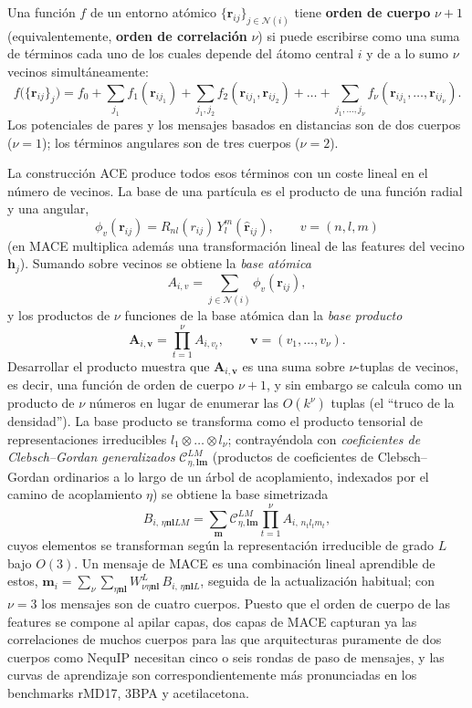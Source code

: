 \begin{definition}\label{def:orden_cuerpo}
Una función $f$ de un entorno atómico $\{\mathbf{r}_{ij}\}_{j \in \mathcal{N}(i)}$ tiene \textbf{orden de cuerpo} $\nu + 1$ (equivalentemente, \textbf{orden de correlación} $\nu$) si puede escribirse como una suma de términos cada uno de los cuales depende del átomo central $i$ y de a lo sumo $\nu$ vecinos simultáneamente:
\[f\big(\{\mathbf{r}_{ij}\}_j\big) = f_0 + \sum_{j_1} f_1(\mathbf{r}_{ij_1}) + \sum_{j_1, j_2} f_2(\mathbf{r}_{ij_1}, \mathbf{r}_{ij_2}) + \dots + \sum_{j_1, \dots, j_\nu} f_\nu(\mathbf{r}_{ij_1}, \dots, \mathbf{r}_{ij_\nu}).\]
Los potenciales de pares y los mensajes basados en distancias son de dos cuerpos ($\nu = 1$); los términos angulares son de tres cuerpos ($\nu = 2$).
\end{definition}

La construcción ACE produce todos esos términos con un coste lineal en el número de vecinos. La base de una partícula es el producto de una función radial y una angular,
\[\phi_v(\mathbf{r}_{ij}) = R_{nl}(r_{ij})\, Y_l^m(\hat{\mathbf{r}}_{ij}), \qquad v = (n, l, m)\]
(en MACE multiplica además una transformación lineal de las features del vecino $\mathbf{h}_j$). Sumando sobre vecinos se obtiene la \emph{base atómica}
\[A_{i,v} = \sum_{j \in \mathcal{N}(i)} \phi_v(\mathbf{r}_{ij}),\]
y los productos de $\nu$ funciones de la base atómica dan la \emph{base producto}
\[\mathbf{A}_{i,\mathbf{v}} = \prod_{t=1}^{\nu} A_{i,v_t}, \qquad \mathbf{v} = (v_1, \dots, v_\nu).\]
Desarrollar el producto muestra que $\mathbf{A}_{i,\mathbf{v}}$ es una suma sobre $\nu$-tuplas de vecinos, es decir, una función de orden de cuerpo $\nu + 1$, y sin embargo se calcula como un producto de $\nu$ números en lugar de enumerar las $O(k^\nu)$ tuplas (el ``truco de la densidad''). La base producto se transforma como el producto tensorial de representaciones irreducibles $l_1 \otimes \dots \otimes l_\nu$; contrayéndola con \emph{coeficientes de Clebsch--Gordan generalizados} $\mathcal{C}^{LM}_{\eta, \mathbf{l}\mathbf{m}}$ (productos de coeficientes de Clebsch--Gordan ordinarios a lo largo de un árbol de acoplamiento, indexados por el camino de acoplamiento $\eta$) se obtiene la base simetrizada
\[B_{i,\, \eta \mathbf{n} \mathbf{l} L M} = \sum_{\mathbf{m}} \mathcal{C}^{LM}_{\eta, \mathbf{l}\mathbf{m}} \prod_{t=1}^{\nu} A_{i,\, n_t l_t m_t},\]
cuyos elementos se transforman según la representación irreducible de grado $L$ bajo $O(3)$. Un mensaje de MACE es una combinación lineal aprendible de estos, $\mathbf{m}_i = \sum_{\nu} \sum_{\eta \mathbf{n} \mathbf{l}} W^{L}_{\nu \eta \mathbf{n} \mathbf{l}}\, B_{i,\, \eta \mathbf{n} \mathbf{l} L}$, seguida de la actualización habitual; con $\nu = 3$ los mensajes son de cuatro cuerpos. Puesto que el orden de cuerpo de las features se compone al apilar capas, dos capas de MACE capturan ya las correlaciones de muchos cuerpos para las que arquitecturas puramente de dos cuerpos como NequIP necesitan cinco o seis rondas de paso de mensajes, y las curvas de aprendizaje son correspondientemente más pronunciadas en los benchmarks rMD17, 3BPA y acetilacetona.

